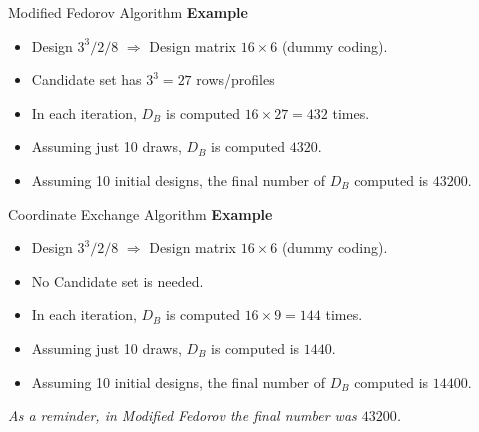 \documentclass[11pt,t]{beamer}
\begin{document}
\begin{frame}[noframenumbering]{Modified Fedorov Algorithm}
\textbf{Example}\\
\begin{itemize}
	\item Design $3^3/2/8$ $\Rightarrow$ Design matrix $16 \times 6$ (dummy coding).
	\item Candidate set has $3^3 = 27$ rows/profiles
	\item In each iteration, $D_B$ is computed $16 \times 27 = 432$ times. 
	\item Assuming just 10 draws, $D_B$ is computed $4320$.
	\item Assuming 10 initial designs, the final number of $D_B$ computed is $43200$.

\end{itemize}	
\end{frame}

\begin{frame}[noframenumbering]{Coordinate Exchange Algorithm}
\textbf{Example}\\
\begin{itemize}
	\item Design $3^3/2/8$ $\Rightarrow$ Design matrix $16 \times 6$ (dummy coding).
	\item No Candidate set is needed.
	\item In each iteration, $D_B$ is computed $16 \times 9 = 144$ times. 
	\item Assuming just 10 draws, $D_B$ is computed is $1440$.
	\item Assuming 10 initial designs, the final number of $D_B$ computed is $14400$.
\end{itemize}	
\small{\textit{As a reminder, in Modified Fedorov the final number was $43200$.}}
\end{frame}
\end{document}
